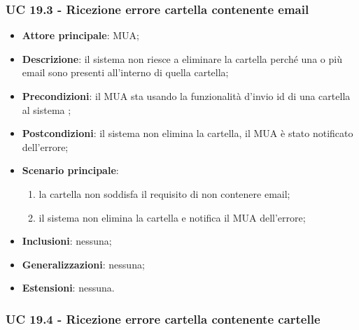     \subsubsection{UC 19.3 - Ricezione errore cartella contenente email} \label{sec:UC19.3}

    \begin{itemize}
        \item \textbf{Attore principale}: MUA;
        \item \textbf{Descrizione}: il sistema non riesce a eliminare la cartella perché una o più email sono presenti all'interno di quella cartella;
        \item \textbf{Precondizioni}: il MUA sta usando la funzionalità d'invio id di una cartella al sistema ;
        \item \textbf{Postcondizioni}: il sistema non elimina la cartella, il MUA è stato notificato dell'errore;
        \item \textbf{Scenario principale}:
            \begin{enumerate}
                \item la cartella non soddisfa il requisito di non contenere email;
                \item il sistema non elimina la cartella e notifica il MUA dell'errore;
            \end{enumerate}
        \item \textbf{Inclusioni}: nessuna;
        \item \textbf{Generalizzazioni}: nessuna;
        \item \textbf{Estensioni}: nessuna.
    \end{itemize}


    \subsubsection{UC 19.4 - Ricezione errore cartella contenente cartelle} \label{sec:UC19.4}

